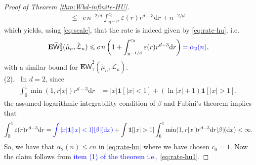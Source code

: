 \documentclass[12pt]{article}
\newcommand{\tLeb}{\tilde{\mathcal{L}}}
\newcommand{\1}{\mathbf{1}}
\newcommand{\md}{\mathrm{d}}
\newcommand{\REMOVE}[1]{}
\newcommand{\RL}[1]{\textcolor{blue}{#1}}
\newcommand{\dy}[1]{\textcolor{blue}{#1}}
\newcommand{\RL}[1]{#1}%
\newcommand{\dy}[1]{#1}%
\renewcommand{\footnote}[1]{}
\begin{document}
{{{{{\begin{proof}[Proof of Theorem \ref{thm:Wbd-infinite-HU}]
\begin{align*}
\leqslant & c \, n^{-2/d}{\int_{n^{-1/d}}^{c_{0}}\varepsilon (r)r^{d-3}\md r}+n^{-2/d}
\end{align*}
which  yields, using  \eqref{eq:scale}, that the rate is indeed given by  \eqref{eq:rate-hu}, i.e.
\begin{align}
\label{eq:rate-hu1}
{\mathbf{E}\widetilde{   \mathsf W}_{2}^{2} (\tilde \mu _{n},\tLeb_{n})}\leqslant c \, n \left(
{1+\int_{n^{-1/d}}^{c_0}\varepsilon (r)r^{d-3}\md r}
\right) \dy{= \alpha_2(n)} ,
\end{align}
with a similar bound for $ {\mathbf{E}\widetilde{   \mathsf W}_1^{2} (\tilde \mu _{n},\tLeb_{n})}$. \\

\noindent (2). \, In $d = 2$, since
%
\begin{align*}
\int_{0}^{1}\min(1,r | x | )r^{d-3} \md r & =   |x|\1[|x| < 1]   + (\ln |x| +  1) \1[|x| > 1]  ,
\end{align*}
%
the assumed logarithmic integrability condition of $\beta$ and Fubini's theorem implies that
%
$$ \int_0^{1} \varepsilon(r)r^{d-3} \md r  =  \dy{\int |x|\1[|x| < 1] |\beta|(\md x)} + \int \1[|x| > 1] \int_{0}^{1}\min(1,r | x | )r^{d-3} \md r |\beta|(\md x) < \infty.$$
%
So, we have that $\alpha_2(n) \leqslant cn$ in \eqref{eq:rate-hu} where we have chosen $c_0 = 1$. Now the claim follows from \dy{item (1) of the theorem i.e., \eqref{eq:rate-hu1}}.
\end{proof}

\REMOVE{  \footnote{\RL{Ok to remove}}  \sout{\noindent (3). \,  Consider \eqref{eq:rate-hu} with $c_0 = 1$. We shall bound $\int_{n^{-1}}^{1} \varepsilon(r)r^{-2} \md r$ as follows. First observe that}
\begin{align*}
\int_{n^{-1}}^{1}\min(1,r | x | )r^{-2} \md r  & = |x| \ln(n) \, \1[ \, |x| \leq 1 \,] + (n-1) \, \1[ \, |x| \geq n]
  \\
  & \quad + \1[ \, 1 < |x| < n \,] \left[ \, |x| (\ln(n) - \ln(|x|) + 1)  -1\,  \right].
 \end{align*}
%
\dy{\sout{So integrating with $|\beta|(\md x)$, we derive that}}
%
\begin{align*}
|\int_{n^{-1}}^{1} \varepsilon(r)r^{-2} \md r | & \leq \ln(n)|\beta|(|x| \leq 1) + n|\beta|(|x| \geq n) + c\ln(n) \int  \1[ \, 1 < |x| < n \,] |x| \, |\beta|(\md x) \\
& \leq c \ln(n),
\end{align*}
%
\dy{\sout{where in the last inequality we have used $\int |x||\beta|(\md x) < \infty$ to deduce that $n|\beta|(|x| \geq n) \to 0$ and the finiteness of the last integral. Now again by Item (1) of the theorem, the claim follows.}}}

}}}}}
\end{document}
